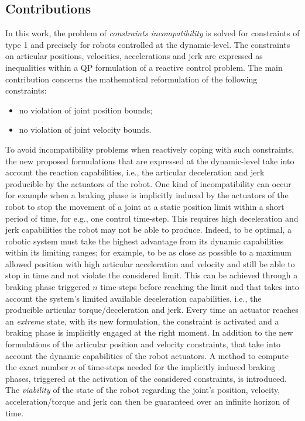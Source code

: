 \subsection{Contributions}
In this work, the problem of \textit{constraints incompatibility} is solved for constraints of type 1 and precisely for robots controlled at the dynamic-level. The constraints on articular positions, velocities, accelerations and jerk are expressed as inequalities within a QP formulation of a reactive control problem. The main contribution concerns the mathematical reformulation of the following constraints:
\begin{itemize}
\item no violation of joint position bounds;
\item no violation of joint velocity bounds.
\end{itemize}
To avoid incompatibility problems when reactively coping with such constraints, the new proposed formulations that are expressed at the dynamic-level take into account the reaction capabilities, i.e., the articular deceleration and jerk producible by the actuators of the robot. One kind of incompatibility can occur for example when a braking phase is implicitly induced by the actuators of the robot to stop the movement of a joint at a static position limit within a short period of time, for e.g., one control time-step. This requires high deceleration and jerk capabilities the robot may not be able to produce. Indeed, to be optimal, a robotic system must take the highest advantage from its dynamic capabilities within its limiting ranges; for example, to be as close as possible to a maximum allowed position with high articular acceleration and velocity and still be able to stop in time and not violate the considered limit. This can be achieved through a braking phase triggered $n$ time-steps before reaching the limit and that takes into account the system's limited available deceleration capabilities, i.e., the producible articular torque/deceleration and jerk. Every time an actuator reaches an \textit{extreme} state, with its new formulation, the constraint is activated and a braking phase is implicitly engaged at the right moment. In addition to the new formulations of the articular position and velocity constraints, that take into account the dynamic capabilities of the robot actuators. A method to compute the exact number $n$ of time-steps needed for the implicitly induced braking phases, triggered at the activation of the considered constraints, is introduced. The \textit{viability} of the state of the robot regarding the joint's position, velocity, acceleration/torque and jerk can then be guaranteed over an infinite horizon of time. \\
